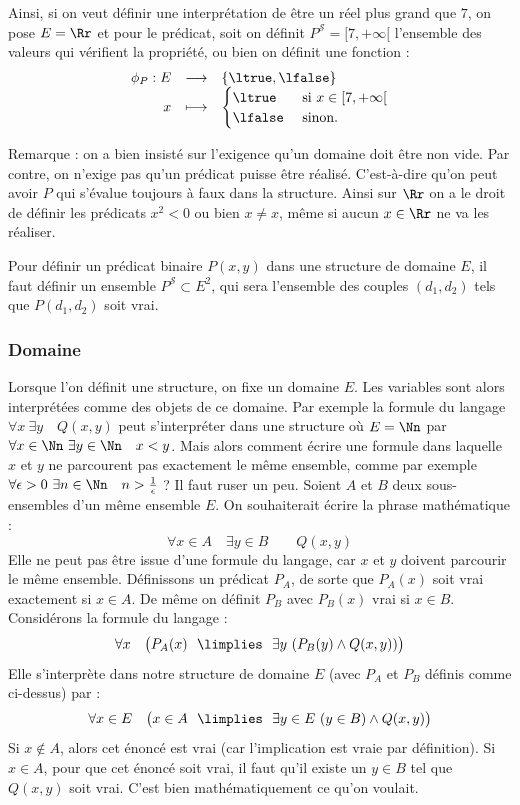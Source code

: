 \documentclass[11pt,class=report,crop=false]{standalone}
\begin{document}
Ainsi, si on veut définir une interprétation de \og{}être un réel plus grand que $7$\fg{}, on pose $E = \Rr$ et pour le prédicat, soit on définit $P^{\mathcal{S}} = [7,+\infty[$ l'ensemble des valeurs qui vérifient la propriété, ou bien on définit une fonction :
\[
\begin{array}{rcl}
	\phi_P : E & \longrightarrow & \{\ltrue, \lfalse\} \\
	x & \longmapsto & \begin{cases}
						\ltrue & \text{ si } x \in [7,+\infty[ \\
						\lfalse & \text{ sinon.}
					\end{cases}
\end{array}
\]


Remarque : on a bien insisté sur l'exigence qu'un domaine doit être non vide.
Par contre, on n'exige pas qu'un prédicat puisse être réalisé. C'est-à-dire qu'on peut avoir $P$ qui s'évalue toujours à faux dans la structure. Ainsi sur $\Rr$ on a le droit de définir les prédicats \og{}$x^2 < 0$\fg{} ou bien \og{}$x \neq x$\fg{}, même si aucun $x \in \Rr$ ne va les réaliser.

Pour définir un prédicat binaire $P(x,y)$ dans une structure de domaine $E$, il faut définir un ensemble $P^{\mathcal{S}} \subset E^2$, qui sera l'ensemble des couples $(d_1,d_2)$ tels que $P(d_1,d_2)$ soit vrai.

\subsubsection{Domaine}

Lorsque l'on définit une structure, on fixe un domaine $E$.
Les variables sont alors interprétées comme des objets de ce domaine.
Par exemple la formule du langage \og{}$\forall x \ \exists y \quad Q(x,y)$\fg{}
peut s'interpréter dans une structure où $E = \Nn$ par 
\og{}$\forall x \in \Nn \ \exists y \in \Nn \quad x<y$\fg{}.
Mais alors comment écrire une formule dans laquelle $x$ et $y$ ne parcourent pas exactement le même ensemble, comme par exemple \og{}$\forall \epsilon > 0 \ \exists n \in \Nn \quad n > \frac 1 \epsilon$\fg{} ?
Il faut ruser un peu. Soient $A$ et $B$ deux sous-ensembles d'un même ensemble $E$.
On souhaiterait écrire la phrase mathématique :
\[
\forall x \in A \quad \exists y \in B \qquad Q(x,y)
\]
Elle ne peut pas être issue d'une formule du langage, car $x$ et $y$ doivent parcourir le même ensemble.
Définissons un prédicat $P_A$, de sorte que $P_A(x)$ soit vrai exactement si $x \in A$. De même on définit $P_B$ avec $P_B(x)$ vrai si $x \in B$.
Considérons la formule du langage :
\[
\forall x \quad \big( P_A(x) \ \  \limplies \ \  \exists y \ ( P_B(y) \land Q(x,y) ) \big)
\]
Elle s'interprète dans notre structure de domaine $E$ (avec $P_A$ et $P_B$ définis comme ci-dessus) par :
\[
\forall x \in E \quad \big( x \in A \ \  \limplies \ \ \exists y \in E \ (y \in B) \land Q(x,y) \big)
\]
Si $x \notin A$, alors cet énoncé est vrai (car l'implication est vraie par définition).
Si $x \in A$, pour que cet énoncé soit vrai, il faut qu'il existe un $y \in B$ tel que $Q(x,y)$ soit vrai.
C'est bien mathématiquement ce qu'on voulait.
\end{document}
